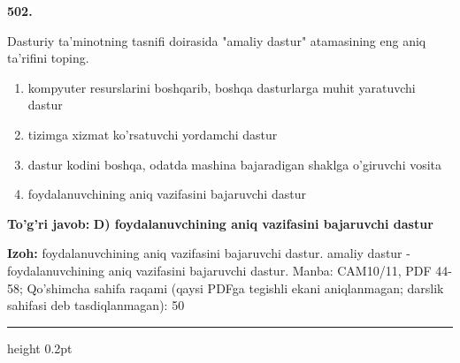 \documentclass[10pt,a4paper]{article}
\begin{document}
{\bfseries\sffamily\color{ink} 502.}
\par
Dasturiy ta'minotning tasnifi doirasida "amaliy dastur" atamasining eng aniq ta'rifini toping.
\begin{enumerate}[label=\Alph*),leftmargin=9mm]
\item kompyuter resurslarini boshqarib, boshqa dasturlarga muhit yaratuvchi dastur
\item tizimga xizmat ko'rsatuvchi yordamchi dastur
\item dastur kodini boshqa, odatda mashina bajaradigan shaklga o'giruvchi vosita
\item foydalanuvchining aniq vazifasini bajaruvchi dastur
\end{enumerate}
\begin{tcolorbox}[enhanced,breakable,colback=teal!4,colframe=teal!60!black,boxrule=0.45pt,arc=1.2mm,left=2.7mm,right=2.7mm,top=1.8mm,bottom=1.8mm,before skip=2mm,after skip=2mm]
{\bfseries\sffamily\color{teal}To'g'ri javob:} \textbf{D) foydalanuvchining aniq vazifasini bajaruvchi dastur}
\par\smallskip
{\bfseries Izoh:} foydalanuvchining aniq vazifasini bajaruvchi dastur. amaliy dastur - foydalanuvchining aniq vazifasini bajaruvchi dastur. Manba: CAM10/11, PDF 44-58; Qo'shimcha sahifa raqami (qaysi PDFga tegishli ekani aniqlanmagan; darslik sahifasi deb tasdiqlanmagan): 50
\end{tcolorbox}
\vspace{2mm}\hrule height 0.2pt\vspace{3mm}
\end{document}
